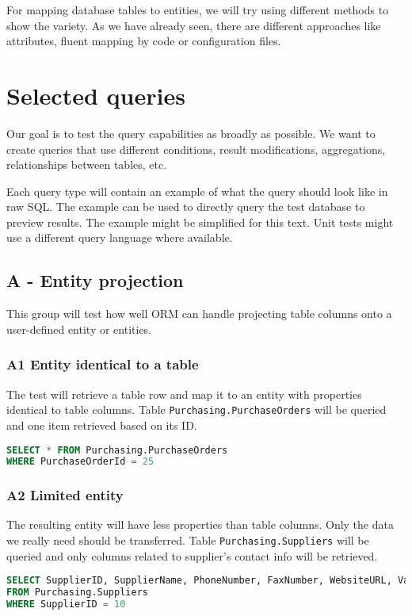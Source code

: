 For mapping database tables to entities, we will try using different methods to show the variety. 
As we have already seen, there are different approaches like attributes, fluent mapping by code or configuration files. 


\section{Selected queries}
Our goal is to test the query capabilities as broadly as possible. We want to create queries that use different conditions, result modifications, aggregations, relationships between tables, etc.

Each query type will contain an example of what the query should look like in raw SQL. The example can be used to directly query the test database to preview results. The example might be simplified for this text. Unit tests might use a different query language where available.

\subsection{A - Entity projection}
This group will test how well ORM can handle projecting table columns onto a user-defined entity or entities.

\subsubsection*{A1 Entity identical to a table}
The test will retrieve a table row and map it to an entity with properties identical to table columns. 
Table \texttt{Purchasing.PurchaseOrders} will be queried and one item retrieved based on its ID.

\begin{lstlisting}[language=SQL]
SELECT * FROM Purchasing.PurchaseOrders 
WHERE PurchaseOrderId = 25
\end{lstlisting}

\subsubsection*{A2 Limited entity}
The resulting entity will have less properties than table columns. Only the data we really need should be transferred. 
Table \texttt{Purchasing.Suppliers} will be queried and only columns related to supplier's contact info will be retrieved.

\begin{lstlisting}[language=SQL]
SELECT SupplierID, SupplierName, PhoneNumber, FaxNumber, WebsiteURL, ValidFrom, ValidTo 
FROM Purchasing.Suppliers 
WHERE SupplierID = 10
\end{lstlisting}

